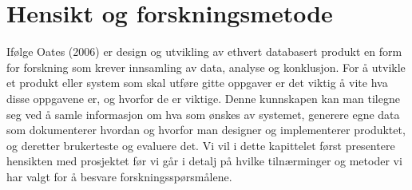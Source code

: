 \chapter{Hensikt og forskningsmetode}
\label{chp:forskningsmetode}


\noindent
Ifølge Oates (2006) er design og utvikling av ethvert databasert produkt en form for forskning som krever innsamling av data, analyse og konklusjon. For å utvikle et produkt eller system som skal utføre gitte oppgaver er det viktig å vite hva disse oppgavene er, og hvorfor de er viktige. Denne kunnskapen kan man tilegne seg ved å samle informasjon om hva som ønskes av systemet, generere egne data som dokumenterer hvordan og hvorfor man designer og implementerer produktet, og deretter brukerteste og evaluere det. Vi vil i dette kapittelet først presentere hensikten med prosjektet før vi går i detalj på hvilke tilnærminger og metoder vi har valgt for å besvare forskningsspørsmålene.

